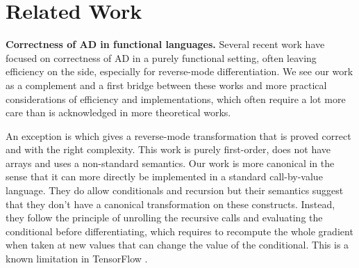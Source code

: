 

\section{Related Work} %
\label{sec:related_work}

\noindent \textbf{Correctness of AD in functional languages.}
Several recent work \cite{huot2020correctness,vakar2020reverse,vakar2020denotational,brunel2019backpropagation,barthe2020versatility,mazza2021automatic,lee2020correctness} have focused on correctness of AD in a purely functional setting, 
often leaving efficiency on the side, especially for reverse-mode differentiation. 
We see our work as a complement and a first bridge between these works 
and more practical considerations of efficiency and implementations, 
which often require a lot more care than is acknowledged in more theoretical works.

An exception is \cite{abadi-plotkin2020} which gives a reverse-mode transformation that is proved correct and with the right complexity.
This work is purely first-order, does not have arrays and uses a non-standard semantics. 
Our work is more canonical in the sense that it can more directly be implemented in a standard call-by-value language.
They do allow conditionals and recursion but their semantics suggest that they don't have a canonical transformation on these constructs. 
Instead, they follow the principle of unrolling the recursive calls and evaluating the conditional before differentiating, 
which requires to recompute the whole gradient when taken at new values that can change the value of the conditional. 
This is a known limitation in TensorFlow \cite{abadi2016tensorflow}. %

